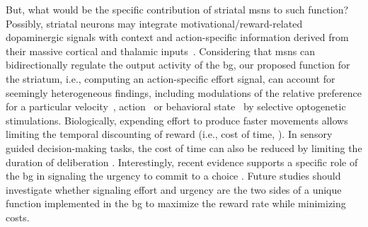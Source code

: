 But, what would be the specific contribution of striatal \glspl{msn} to such function?
Possibly, striatal neurons may integrate motivational/reward-related dopaminergic signals with context and action-specific information derived from their massive cortical and thalamic inputs~\cite{Hunnicutt2016}.
Considering that \glspl{msn} can bidirectionally regulate the output activity of the \gls{bg}, our proposed function for the striatum, i.e., computing an action-specific effort signal, can account for seemingly heterogeneous findings, including modulations of the relative preference for a particular velocity~\cite{ Yttri2016Nature}, action~\cite{Tai2012NN, Kravitz2012NN} or behavioral state~\cite{Kravitz2010Nature} by selective optogenetic stimulations.
Biologically, expending effort to produce faster movements allows limiting the temporal discounting of reward (i.e., cost of time, \cite{Shadmehr2019TINS}).
In sensory guided decision-making tasks, the cost of time can also be reduced by limiting the duration of deliberation \cite{Carland2019}. 
Interestingly, recent evidence supports a specific role of the \gls{bg} in signaling the urgency to commit to a choice \cite{Thura2017Neuron,Carland2019}.
Future studies should investigate whether signaling effort and urgency are the two sides of a unique function implemented in the \gls{bg} to maximize the reward rate while minimizing costs.